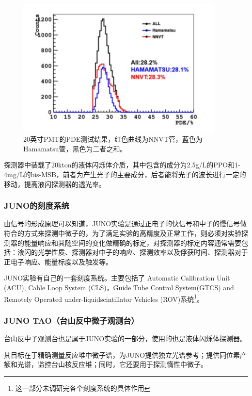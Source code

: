 \documentclass[10pt,a4paper]{article}
\begin{document}
\begin{figure}[ht]
 \centering
 \includegraphics[height=7cm]{images/pmt测试.png}
 \caption{20英寸PMT的PDE测试结果，红色曲线为NNVT管，蓝色为Hamamatsu管，黑色为二者之和。}
 \label{fig:singleblock}
\end{figure}

探测器中装载了20kton的液体闪烁体介质，其中包含的成分为2.5g/L的PPO和1-4mg/L的bis-MSB，前者为产生光子的主要成分，后者能将光子的波长进行一定的移动，提高液闪探测器的透光率。

\subsubsection{JUNO的刻度系统}\label{sub:logicinter}
由信号的形成原理可以知道，JUNO实验是通过正电子的快信号和中子的慢信号做符合的方式来探测中微子的，为了满足实验的高精度及正常工作，则必须对实验探测器的能量响应和其随空间的变化做精确的标定，对探测器的标定内容通常需要包括：液闪的光学性质、探测器对中子的响应、探测效率以及俘获时间、探测器对于正电子响应、能量标度以及触发等。

JUNO实验有自己的一套刻度系统。主要包括了 Automatic Calibration Unit (ACU),
Cable Loop System (CLS)，Guide Tube Control System(GTCS) and Remotely Operated under-liquidscintillator Vehicles (ROV)系统\footnote{这一部分未调研完各个刻度系统的具体作用}。

\subsubsection{JUNO TAO（台山反中微子观测台）}\label{sub:logicinter}

台山反中子观测台也是属于JUNO实验的一部分，使用的也是液体闪烁体探测器。

其目标在于精确测量反应堆中微子谱，为JUNO提供独立光谱参考；提供同位素产额和光谱，监控台山核反应堆；同时，它还要用于探测惰性中微子。
\end{document}
